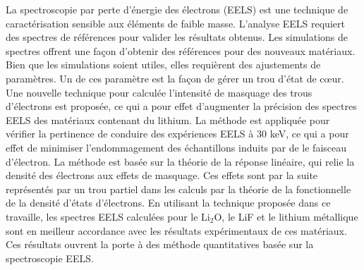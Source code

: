 

La spectroscopie par perte d'\'energie des \'electrons (EELS) est une technique de caract\'erisation sensible aux \'el\'ements de faible masse.  L'analyse EELS requiert des spectres de r\'ef\'erences pour valider les r\'esultats obtenus. Les simulations de spectres offrent une façon d'obtenir des r\'ef\'erences pour des nouveaux mat\'eriaux.  Bien que les simulations soient utiles, elles requi\`erent des ajustements de param\`etres.  Un de ces param\`etre est la fa\c{c}on de g\'erer un trou d'\'etat de c\oe ur. Une nouvelle technique pour calcul\'ee l'intensit\'e de masquage des trous d'\'electrons est propos\'ee, ce qui a pour effet d'augmenter la pr\'ecision des spectres EELS des mat\'eriaux contenant du lithium. La m\'ethode est appliquée pour v\'erifier la pertinence de conduire des expériences EELS \`a 30 keV, ce qui a pour effet de minimiser l'endommagement des \'echantillons induits par de le faisceau d'électron. La m\'ethode est bas\'ee sur la th\'eorie de la r\'eponse lin\'eaire, qui relie la densit\'e des \'electrons aux effets de masquage. Ces effets sont par la suite repr\'esentés par un trou partiel dans les calculs par la th\'eorie de la fonctionnelle de la densité d'états d'électrons. En utilisant la technique propos\'ee dans ce travaille, les spectres EELS calcul\'ees pour le $\mathrm{Li_2O}$, le LiF et le lithium métallique sont en meilleur accordance avec les r\'esultats exp\'erimentaux de ces mat\'eriaux. Ces r\'esultats ouvrent la porte \`a des méthode quantitatives bas\'ee sur la spectroscopie EELS.

